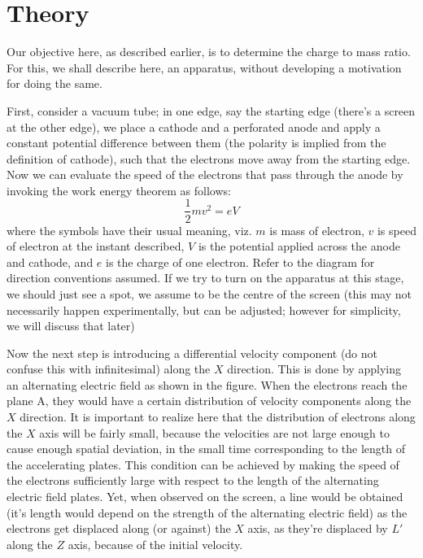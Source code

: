 \section{Theory}
	Our objective here, as described earlier, is to determine the charge to mass ratio. For this, we shall describe here, an apparatus, without developing a motivation for doing the same.
	\par
	First, consider a vacuum tube; in one edge, say the starting edge (there's a screen at the other edge), we place a cathode and a perforated anode and apply a constant potential difference between them (the polarity is implied from the definition of cathode), such that the electrons move away from the starting edge. Now we can evaluate the speed of the electrons that pass through the anode by invoking the work energy theorem as follows:
	\begin{equation}
		\frac 1 2 mv^2 = eV
	\end{equation}
	where the symbols have their usual meaning, viz. $m$ is mass of electron, $v$ is speed of electron at the instant described, $V$ is the potential applied across the anode and cathode, and $e$ is the charge of one electron. Refer to the diagram for direction conventions assumed. If we try to turn on the apparatus at this stage, we should just see a spot, we assume to be the centre of the screen (this may not necessarily happen experimentally, but can be adjusted; however for simplicity, we will discuss that later)
	\par
	Now the next step is introducing a differential velocity component (do not confuse this with infinitesimal) along the $X$ direction. This is done by applying an alternating electric field as shown in the figure. When the electrons reach the plane A, they would have a certain distribution of velocity components along the $X$ direction. It is important to realize here that the distribution of electrons along the $X$ axis will be fairly small, because the velocities are not large enough to cause enough spatial deviation, in the small time corresponding to the length of the accelerating plates. This condition can be achieved by making the speed of the electrons sufficiently large with respect to the length of the alternating electric field plates. Yet, when observed on the screen, a line would be obtained (it's length would depend on the strength of the alternating electric field) as the electrons get displaced along (or against) the $X$ axis, as they're displaced by $L'$ along the $Z$ axis, because of the initial velocity.
	\par

